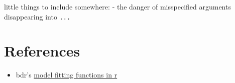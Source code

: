 \documentclass[]{book}
\providecommand{\tightlist}{%
  \setlength{\itemsep}{0pt}\setlength{\parskip}{0pt}}
\theoremstyle{definition}
\theoremstyle{definition}
\theoremstyle{definition}
\theoremstyle{remark}
\begin{document}
little things to include somewhere: - the danger of misspecified
arguments disappearing into \texttt{...}

\chapter{References}\label{references}

\begin{itemize}
\tightlist
\item
  bdr's
  \href{https://developer.r-project.org/model-fitting-functions.html}{model
  fitting functions in r}
\end{itemize}


\end{document}
